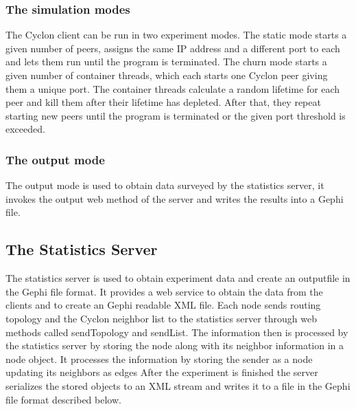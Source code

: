 \subsubsection{The simulation modes}
The Cyclon client can be run in two experiment modes. The static mode starts a
given number of peers, assigns the same IP address and a different port to each
and lets them run until the program is terminated. The churn mode starts a
given number of container threads, which each starts one Cyclon peer giving them
a unique port. The container threads calculate a random lifetime for each peer
and kill them after their lifetime has depleted. After that, they repeat
starting new peers until the program is terminated or the given port threshold
is exceeded.
\subsubsection{The output mode}
The output mode is used to obtain data surveyed by the statistics server, it
invokes the output web method of the server and writes the results into a Gephi
file.  

\subsection{The Statistics Server}

The statistics server is used to obtain experiment data and create an outputfile
in the Gephi file format. It provides a web service to obtain the data from the
clients and to create an Gephi readable XML file.  Each node sends routing
topology and the Cyclon neighbor list to the statistics server
through web methods called sendTopology and sendList. The information then is
processed by the statistics server by storing the node along with its neighbor
information in a node object. It processes the information by storing the
sender as a node updating its neighbors as edges After the experiment is
finished the server serializes the stored objects to an XML stream and writes
it to a file in the Gephi file format described below.


